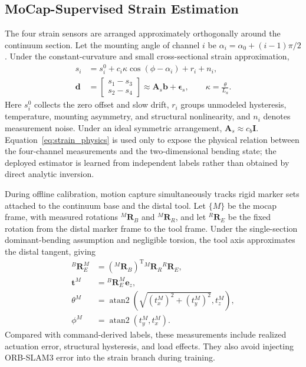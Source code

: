 \documentclass[journal,twoside]{IEEEtran}
\begin{document}
\subsection{MoCap-Supervised Strain Estimation}
The four strain sensors are arranged approximately orthogonally around the continuum section. Let the mounting angle of channel $i$ be $\alpha_i=\alpha_0+(i-1)\pi/2$. Under the constant-curvature and small cross-sectional strain approximation,
\begin{equation}
\begin{aligned}
s_i &= s_i^0+c_i\kappa\cos(\phi-\alpha_i)+r_i+n_i,\\
\mathbf d &=
\begin{bmatrix}s_1-s_3\\s_2-s_4\end{bmatrix}
\approx \mathbf A_s\mathbf b+\boldsymbol\epsilon_s,
\qquad \kappa=\frac{\theta}{L_a}.
\end{aligned}
\label{eq:strain_physics}
\end{equation}
Here $s_i^0$ collects the zero offset and slow drift, $r_i$ groups unmodeled hysteresis, temperature, mounting asymmetry, and structural nonlinearity, and $n_i$ denotes measurement noise. Under an ideal symmetric arrangement, $\mathbf A_s\approx c_b\mathbf I$. Equation~\eqref{eq:strain_physics} is used only to expose the physical relation between the four-channel measurements and the two-dimensional bending state; the deployed estimator is learned from independent labels rather than obtained by direct analytic inversion.

During offline calibration, motion capture simultaneously tracks rigid marker sets attached to the continuum base and the distal tool. Let $\{M\}$ be the mocap frame, with measured rotations ${}^{M}\mathbf R_B$ and ${}^{M}\mathbf R_R$, and let ${}^{R}\mathbf R_E$ be the fixed rotation from the distal marker frame to the tool frame. Under the single-section dominant-bending assumption and negligible torsion, the tool axis approximates the distal tangent, giving
\begin{equation}
\begin{aligned}
{}^{B}\mathbf R_E^{M}
&=({}^{M}\mathbf R_B)^{\mathrm T}{}^{M}\mathbf R_R{}^{R}\mathbf R_E,\\
\mathbf t^{M}&={}^B\mathbf R_E^{M}\mathbf e_z,\\
\theta^{M}&=\operatorname{atan2}\!\left(\sqrt{(t_x^M)^2+(t_y^M)^2},t_z^M\right),\\
\phi^{M}&=\operatorname{atan2}(t_y^M,t_x^M).
\end{aligned}
\label{eq:mocap_label}
\end{equation}
Compared with command-derived labels, these measurements include realized actuation error, structural hysteresis, and load effects. They also avoid injecting ORB-SLAM3 error into the strain branch during training.
\end{document}
